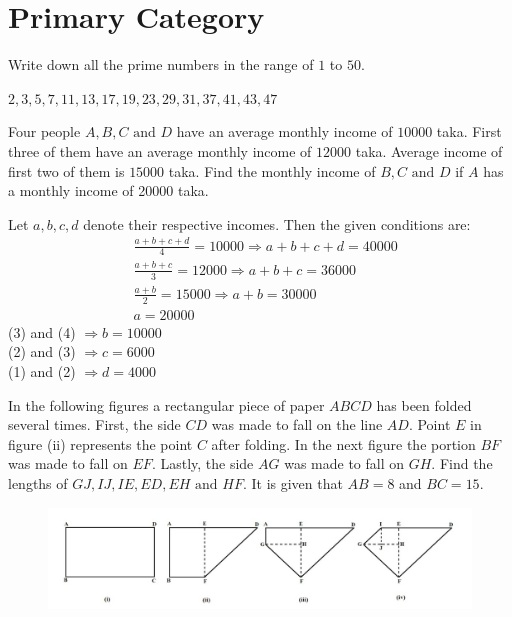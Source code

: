 \documentclass{subfile}
\begin{document}
\section{Primary Category}
	\begin{problem} Write down all the prime numbers in the range of $1$ to $50$.
	\end{problem}

	\begin{solution} $2, 3, 5, 7, 11, 13, 17, 19, 23, 29, 31, 37, 41, 43, 47$
	\end{solution}
	\begin{problem} Four people $A, B, C \text{ and } D$ have an average monthly income of $10000$ taka. First three of them have an
		average monthly income of $12000$ taka. Average income of first two of them is $15000$ taka. Find the
		monthly income of $B, C \text{ and } D$ if $A$ has a monthly income of 20000 taka.\\

	\end{problem}

	\begin{solution} Let $a, b, c, d$ denote their respective incomes. Then the given conditions are:
		\begin{align}
		&\frac{a+b+c+d}{4}=10000\Rightarrow a+b+c+d=40000\\
		&\frac{a+b+c}{3}=12000\Rightarrow a+b+c=36000\\
		&\frac{a+b}{2}=15000\Rightarrow a+b=30000\\
		& a=20000
		\end{align}
		(3) and (4) $\Rightarrow b=10000$\\
		(2) and (3) $\Rightarrow c=6000$\\
		(1) and (2) $\Rightarrow d=4000$\\

	\end{solution}

	\begin{problem} In the following figures a rectangular piece of paper $ABCD$ has been folded several times. First, the	side $CD$ was made to fall on the line $AD$. Point $E$ in figure (ii) represents the point $C$ after folding. In the next figure the portion $BF$ was made to fall on $EF$. Lastly, the side $AG$ was made to fall on $GH$. Find the lengths of $GJ, IJ, IE, ED, EH \text{ and } HF$. It is given that $AB = 8$ and $BC = 15$.
		\begin{figure}[h]
			\centering
			\includegraphics[width=1\linewidth]{Prob3.png}
		\end{figure}

	\end{problem}
\end{document}
